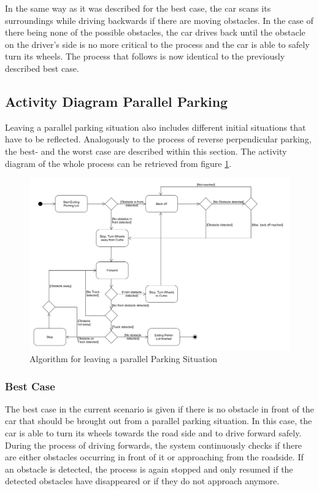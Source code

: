In the same way as it was described for the best case, the car scans its
surroundings while driving backwards if there are moving obstacles. In the case
of there being none of the possible obstacles, the car drives back until the
obstacle on the driver's side is no more critical to the process and the car is
able to safely turn its wheels. The process that follows is now identical to the
previously described best case.

\subsection{Activity Diagram Parallel Parking}
Leaving a parallel parking situation also includes different initial situations
that have to be reflected. Analogously to the process of reverse perpendicular
parking, the best- and the worst case are described within this section. The
activity diagram of the whole process can be retrieved from figure
\ref{fig:ActivityParallel}.

\begin{figure}
\captionsetup{justification=centering}
\includegraphics[width=\textwidth]{res/systemAnalysis/ActivityObstacleLenghtwise.png}
\caption{Algorithm for leaving a parallel Parking Situation}
\label{fig:ActivityParallel}
\end{figure}

\subsubsection{Best Case}
The best case in the current scenario is given if there is no obstacle in front
of the car that should be brought out from a parallel parking situation. In this
case, the car is able to turn its wheels towards the road side and to drive
forward safely. During the process of driving forwards, the system continuously
checks if there are either obstacles occurring in front of it or approaching
from the roadside. If an obstacle is detected, the process is again stopped and
only resumed if the detected obstacles have disappeared or if they do not
approach anymore.


